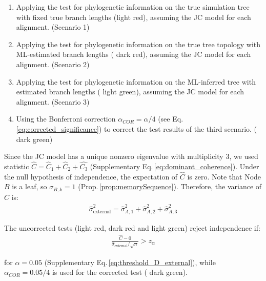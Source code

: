 \medskip

\begin{enumerate}
\item Applying the test for phylogenetic information on the true simulation tree with fixed true branch lengths ({\color{truetree}light red}), assuming the JC model for each alignment. (Scenario 1)
\item Applying the test for phylogenetic information on the true tree topology with ML-estimated branch lengths ({\color{truetreeML} dark red}), assuming the JC model for each alignment. (Scenario 2)
\item Applying the test for phylogenetic information on the ML-inferred tree with estimated branch lengths ({\color{MLtree} light green}), assuming the JC model for each alignment. (Scenario 3) 
\item Using the  Bonferroni correction $\alpha_{COR} = \alpha/4$ (see Eq. \eqref{eq:corrected_significance}) to correct the test results of the third scenario. ({\color{MLtreeBonferroni} dark green})
\end{enumerate}


\medskip

Since the JC model has a unique nonzero eigenvalue with multiplicity $3$, we used statistic $\hat{C} = \hat{C}_1+\hat{C}_2+\hat{C_3}$ (Supplementary Eq.\,\eqref{eq:dominant_coherence}). Under the null hypothesis of independence, the expectation of $\hat{C}$ is zero. Note that Node $B$ is a leaf, so $\sigma_{B,k}=1$ (Prop.\,\ref{prop:memorySequence}). Therefore, the variance of $\hat C$ is:
\begin{align*}
  \hat{\sigma}^2_{\text{external}} =  \hat{\sigma}^2_{A,1}+\hat{\sigma}^2_{A,2}+\hat{\sigma}^2_{A,3}
\end{align*}

The uncorrected tests ({\color{truetree}light red}, {\color{truetreeML} dark red} and {\color{MLtree} light green}) reject independence if:
\begin{align*}
 \frac{\hat{C}-0}{\hat{\sigma}_{\text{external}}/\sqrt{n}} > z_\alpha 
\end{align*}

for $\alpha=0.05$ (Supplementary Eq.\,\eqref{eq:threshold_D_external}), while $\alpha_{COR}=0.05/4$  is used for the corrected test ({\color{MLtreeBonferroni} dark green}).

\medskip


